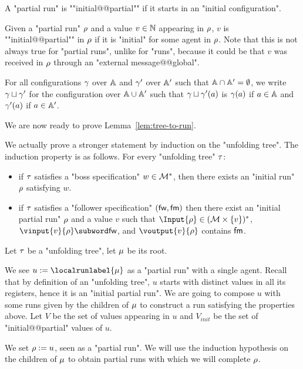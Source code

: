 \begin{definition}
	\AP A "partial run" is ""initial@@partial"" if it starts in an "initial configuration".
	
	\AP Given a "partial run" $\rho$ and a value $v \in \mathbb{N}$ appearing in $\rho$, $v$ is ""initial@@partial"" in $\rho$ if it is "initial" for some agent in $\rho$. Note that this is not always true for "partial runs", unlike for "runs", because it could be that $v$ was received in $\rho$ through an "external message@@global". 
	
	For all configurations $\gamma$ over $\mathbb{A}$ and $\gamma'$ over $\mathbb{A}'$ such that $\mathbb{A} \cap \mathbb{A}' = \emptyset$, we write $\gamma \sqcup \gamma'$ for the configuration over $\mathbb{A} \cup \mathbb{A}'$ such that $\gamma \sqcup \gamma'(a)$ is $\gamma(a)$ if $a \in \mathbb{A}$ and $\gamma'(a)$ if $a \in \mathbb{A}'$. 
	
\end{definition}


We are now ready to prove Lemma~\ref{lem:tree-to-run}.

\LemTreeToRun*

We actually prove a stronger statement by induction on the "unfolding tree".
The induction property is as follows. For every "unfolding tree" $\tau$:
\begin{itemize}
	\item if $\tau$ satisfies a "boss specification" $w \in \mathcal{M}^*$, then there exists an "initial run" $\rho$ satisfying $w$.
	\item if $\tau$ satisfies a "follower specification" $(\mathsf{fw}, \mathsf{fm})$ then there exist an "initial partial run" $\rho$ and a value $v$ such that $\Input{\run} \in (\messages\times \set{v})^*$, $\vinput{v}{\run} \subword \followwordspec$, and $\voutput{v}{\run}$ contains $\mathsf{fm}$.
\end{itemize}

Let $\tau$ be a "unfolding tree", let $\mu$ be its root.

We see $u := \localrunlabel{\node}$ as a "partial run" with a single agent. Recall that by definition of an "unfolding tree", $u$ starts with distinct values in all its registers, hence it is an "initial partial run".
We are going to compose $u$ with some runs given by the children of $\mu$ to construct a run satisfying the properties above.
Let $V$ be the set of values appearing in $u$ and $V_{init}$ be the set of "initial@@partial" values of $u$.

We set $\rho := u$, seen as a "partial run". We will use the induction hypothesis on the children of $\mu$ to obtain partial runs with which we will complete $\rho$.

